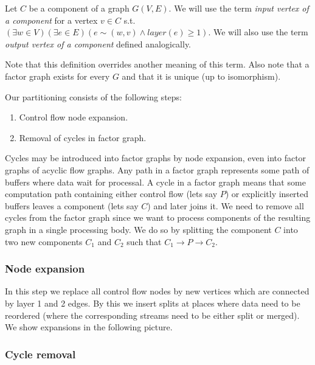 \begin{define}
  Let $C$ be a component of a graph $G(V,E)$. We will use the term \emph{input vertex of a component} for a vertex $v \in C$ s.t. $(\exists w \in V)(\exists e \in E)( e \sim (w,v) \land layer(e) \geq 1 )$. We will also use the term \emph{output vertex of a component} defined analogically.
\end{define}

Note that this definition overrides another meaning of this term. Also note that a factor graph exists for every $G$ and that it is unique (up to isomorphism).

Our partitioning consists of the following steps:
\begin{enumerate}
  \item Control flow node expansion. 
  \item Removal of cycles in factor graph. 
\end{enumerate}

Cycles may be introduced into factor graphs by node expansion, even into factor graphs of acyclic flow graphs. Any path in a factor graph represents some path of buffers where data wait for processal. A cycle in a factor graph means that some computation path containing either control flow (lets say $P$) or explicitly inserted buffers leaves a component (lets say $C$) and later joins it. We need to remove all cycles from the factor graph since we want to process components of the resulting graph in a single processing body. We do so by splitting the component $C$ into two new components $C_1$ and $C_2$ such that $C_1 \rightarrow P \rightarrow C_2$.

\subsubsection{Node expansion}

In this step we replace all control flow nodes by new vertices which are connected by layer 1 and 2 edges. By this we insert splits at places where data need to be reordered (where the corresponding streams need to be either split or merged). We show expansions in the following picture.


\subsubsection{Cycle removal}

